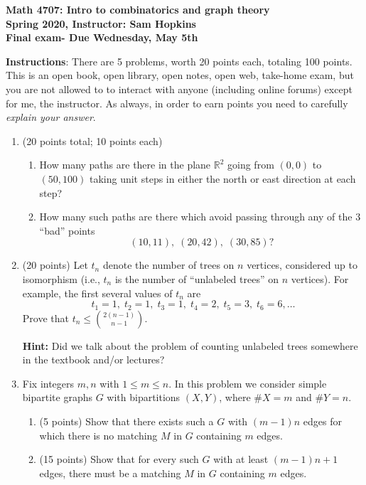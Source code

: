 \documentclass[11pt]{article}
\begin{document}
\thispagestyle{empty}

\begin{center}
{\bf Math 4707: Intro to combinatorics and graph theory \\
Spring 2020, Instructor: Sam Hopkins \\
Final exam- Due Wednesday, May 5th}
\end{center}

{\bf Instructions}: There are 5 problems, worth 20 points each, totaling 100 points. This is an open book, open library, open notes, open web, take-home exam, but you are not allowed to to interact with anyone (including online forums) except for me, the instructor. As always, in order to earn points you need to carefully \emph{explain your answer}.

\begin{enumerate}
\item (20 points total; 10 points each) 
\begin{enumerate}
\item How many paths are there in the plane $\mathbb{R}^2$ going from $(0,0)$ to $(50,100)$ taking unit steps in either the north or east direction at each step?
\item How many such paths are there which avoid passing through any of the $3$ ``bad'' points
\[ (10,11), \; (20,42), \; (30, 85)?\]
\end{enumerate}

\item (20 points) Let $t_n$ denote the number of trees on $n$ vertices, considered up to isomorphism (i.e., $t_n$ is the number of ``unlabeled trees'' on $n$ vertices). For example, the first several values of $t_n$ are 
\[t_1=1, \; t_2=1, \; t_3=1, \; t_4=2, \; t_5=3, \; t_6=6,\ldots\]
Prove that $\displaystyle t_n \leq \binom{2(n-1)}{n-1}$. 

{\bf Hint:} Did we talk about the problem of counting unlabeled trees somewhere in the textbook and/or lectures?

\item Fix integers $m, n$ with $1 \leq m \leq n$. In this problem we consider simple bipartite graphs $G$ with bipartitions $(X,Y)$, where $\#X=m$ and $\#Y=n$.
\begin{enumerate}
\item (5 points) Show that there exists such a $G$ with $(m-1)n$ edges for which there is no matching $M$ in $G$ containing $m$ edges.
\item (15 points) Show that for every such $G$ with at least $(m-1)n + 1$ edges, there must be a matching $M$ in $G$ containing $m$ edges.
\end{enumerate}


\end{enumerate}
\end{document}
